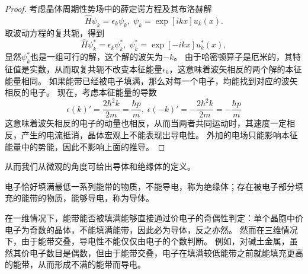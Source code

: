 \begin{proof}\small
    考虑晶体周期性势场中的薛定谔方程及其布洛赫解
    \begin{equation}
        \hat H \psi_k = \epsilon_k \psi_k, \; \psi_k = \exp[ikx] u_k(x).
    \end{equation}
    取波动方程的复共轭，得到
    \begin{equation}
        \hat H \psi_k^* = \epsilon_k \psi_k^*, \; \psi_k^* = \exp[-ikx] u_k^*(x),
    \end{equation}
    显然$\psi_k^*$也是一组可行的解，这个解的波矢为$-k$。
    由于哈密顿算子是厄米的，其特征值是实数，从而取复共轭不改变本征能量$\epsilon_k$，这意味着波矢相反的两个解的本征能量相同。
    如果能带已经被电子填满，那么对每一个电子，均能找到对应的波矢相反的电子。
    现在，考虑本征能量的导数
    \begin{equation}
        \epsilon(k)' = \frac{2 \hbar^2 k}{2m} = \frac{\hbar p}{m},\; \epsilon(-k)' = - \frac{2 \hbar^2 k}{2m} = - \frac{\hbar p}{m}
    \end{equation}
    这意味着波矢相反的电子的动量也相反，从而当两者共同运动时，其速度一定相反，产生的电流抵消，晶体宏观上不能表现出导电性。
    外加的电场只能影响本征能量中的势能，因此不影响上面的推导。
\end{proof}

从而我们从微观的角度可给出导体和绝缘体的定义。
\begin{definition}
    电子恰好填满最低一系列能带的物质，不能导电，称为绝缘体；存在被电子部分填充的能带的物质，能够导电，称为导体。
\end{definition}

在一维情况下，能带能否被填满能够直接通过价电子的奇偶性判定：单个晶胞中价电子为奇数的晶体，不能填满能带，因此必为导体，反之亦然。
然而在三维情况下，由于能带交叠，导电性不能仅仅由电子的个数判断。
例如，对碱土金属，虽然其价电子数目是偶数，但由于能带交叠，电子在填满较低能带之前就能填充更高的能带，从而形成不满的能带而导电。
